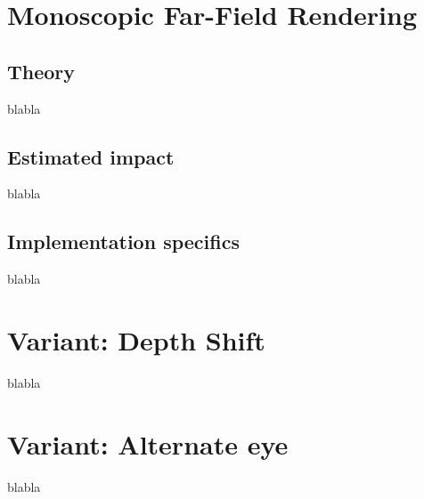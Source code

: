 
\section{Monoscopic Far-Field Rendering}
\subsection{Theory}
blabla
\subsection{Estimated impact}
blabla
\subsection{Implementation specifics}
blabla



\section{Variant: Depth Shift}
blabla

\section{Variant: Alternate eye}
blabla
